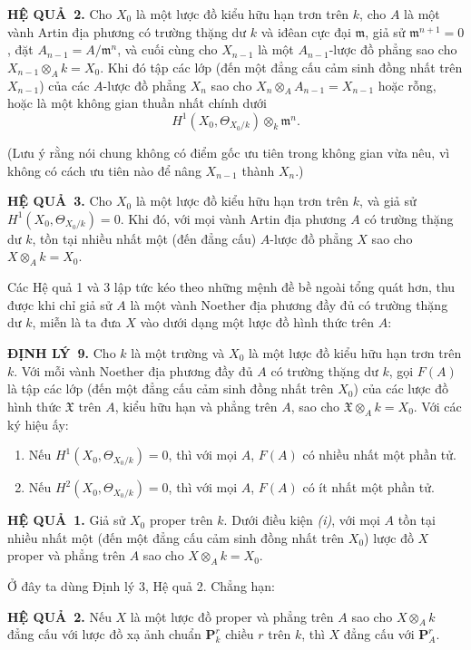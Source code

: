 \documentclass[11pt,twoside,openany]{book}
\numberwithin{equation}{section}
\newcommand{\src}[1]{%
  \phantomsection\hypertarget{src:\fgasourceid:#1}{}%
  \marginpar{\raggedleft\footnotesize\sffamily #1}%
}
\newcommand{\fgasourceid}{unset}
\newcommand{\result}[2]{\par\medskip\noindent\textbf{#1\if\relax\detokenize{#2}\relax\else\ #2\fi.}\quad}
\begin{document}
\src{205}
\result{HỆ QUẢ}{2} Cho $X_0$ là một lược đồ kiểu hữu hạn trơn trên $k$, cho
$A$ là một vành Artin địa phương có trường thặng dư $k$ và iđêan cực đại
$\mathfrak m$, giả sử $\mathfrak m^{n+1}=0$, đặt
$A_{n-1}=A/\mathfrak m^n$, và cuối cùng cho $X_{n-1}$ là một
$A_{n-1}$-lược đồ phẳng sao cho $X_{n-1}\otimes_A k=X_0$. Khi đó tập các
lớp (đến một đẳng cấu cảm sinh đồng nhất trên $X_{n-1}$) của các $A$-lược đồ
phẳng $X_n$ sao cho $X_n\otimes_A A_{n-1}=X_{n-1}$ hoặc rỗng, hoặc là một
không gian thuần nhất chính dưới
\[
  H^1(X_0,\Theta_{X_0/k})\otimes_k\mathfrak m^n.
\]

(Lưu ý rằng nói chung không có điểm gốc ưu tiên trong không gian vừa nêu, vì
không có cách ưu tiên nào để nâng $X_{n-1}$ thành $X_n$.)

\result{HỆ QUẢ}{3} Cho $X_0$ là một lược đồ kiểu hữu hạn trơn trên $k$, và
giả sử $H^1(X_0,\Theta_{X_0/k})=0$. Khi đó, với mọi vành Artin địa phương
$A$ có trường thặng dư $k$, tồn tại nhiều nhất một (đến đẳng cấu) $A$-lược đồ
phẳng $X$ sao cho $X\otimes_A k=X_0$.

Các Hệ quả 1 và 3 lập tức kéo theo những mệnh đề bề ngoài tổng quát hơn, thu
được khi chỉ giả sử $A$ là một vành Noether địa phương đầy đủ có trường thặng
dư $k$, miễn là ta đưa $X$ vào dưới dạng một lược đồ hình thức trên $A$:

\result{ĐỊNH LÝ}{9} Cho $k$ là một trường và $X_0$ là một lược đồ kiểu hữu
hạn trơn trên $k$. Với mỗi vành Noether địa phương đầy đủ $A$ có trường thặng
dư $k$, gọi $F(A)$ là tập các lớp (đến một đẳng cấu cảm sinh đồng nhất trên
$X_0$) của các lược đồ hình thức $\mathfrak X$ trên $A$, kiểu hữu hạn và phẳng
trên $A$, sao cho $\mathfrak X\otimes_A k=X_0$. Với các ký hiệu ấy:
\begin{enumerate}
  \item[\textit{i.}] Nếu $H^1(X_0,\Theta_{X_0/k})=0$, thì với mọi $A$,
    $F(A)$ có nhiều nhất một phần tử.
  \item[\textit{ii.}] Nếu $H^2(X_0,\Theta_{X_0/k})=0$, thì với mọi $A$,
    $F(A)$ có ít nhất một phần tử.
\end{enumerate}

\src{206}
\result{HỆ QUẢ}{1} Giả sử $X_0$ proper trên $k$. Dưới điều kiện
\textit{(i)}, với mọi $A$ tồn tại nhiều nhất một (đến một đẳng cấu cảm sinh
đồng nhất trên $X_0$) lược đồ $X$ proper và phẳng trên $A$ sao cho
$X\otimes_A k=X_0$.

Ở đây ta dùng Định lý 3, Hệ quả 2. Chẳng hạn:

\result{HỆ QUẢ}{2} Nếu $X$ là một lược đồ proper và phẳng trên $A$ sao cho
$X\otimes_A k$ đẳng cấu với lược đồ xạ ảnh chuẩn $\mathbf P_k^r$ chiều $r$
trên $k$, thì $X$ đẳng cấu với $\mathbf P_A^r$.
\end{document}
